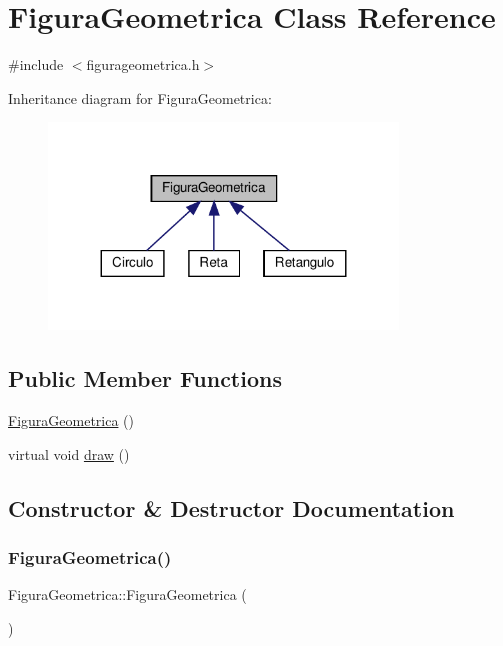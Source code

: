 \hypertarget{class_figura_geometrica}{}\section{Figura\+Geometrica Class Reference}
\label{class_figura_geometrica}


{\ttfamily \#include $<$figurageometrica.\+h$>$}



Inheritance diagram for Figura\+Geometrica\+:
\nopagebreak
\begin{figure}[H]
\begin{center}
\leavevmode
\includegraphics[width=263pt]{class_figura_geometrica__inherit__graph}
\end{center}
\end{figure}
\subsection*{Public Member Functions}
\begin{DoxyCompactItemize}
\item 
\hyperlink{class_figura_geometrica_a81d7c7efaea511e60a15f5a363138dd9}{Figura\+Geometrica} ()
\item 
virtual void \hyperlink{class_figura_geometrica_a417090ea2019fc1d58cdb345167aebea}{draw} ()
\end{DoxyCompactItemize}


\subsection{Constructor \& Destructor Documentation}
\mbox{\label{class_figura_geometrica_a81d7c7efaea511e60a15f5a363138dd9}} 
\subsubsection{\texorpdfstring{Figura\+Geometrica()}{FiguraGeometrica()}}
{\footnotesize\ttfamily Figura\+Geometrica\+::\+Figura\+Geometrica (\begin{DoxyParamCaption}{ }\end{DoxyParamCaption})}



